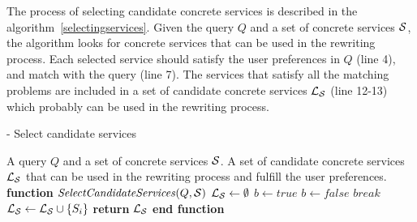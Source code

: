 The process of selecting candidate concrete services
is described in the algorithm~\ref{selectingservices}.
Given the query $Q$ and a set of concrete services $\hbox{${\cal S}$}$, the algorithm
looks for concrete services that can be used in the rewriting process.
Each selected service should satisfy the user preferences in $Q$ (line 4), and match with the query (line 7).
The services that satisfy all the matching problems are included in a set of candidate concrete services $\hbox{${\cal L_{S}}$}$ (line 12-13) which probably can be used in the rewriting process.


\begin{algorithm}
\caption{ - Select candidate services}
\label{selectingservices}
\begin{algorithmic}[1]
\REQUIRE A query $Q$ and a set of concrete services $\hbox{${\cal S}$}$.
\ENSURE A set of candidate concrete services $\hbox{${\cal L_{S}}$}$ that can be used in the rewriting process and fulfill the user preferences.
\STATE \textbf{function} $\mathit{SelectCandidateServices} (Q, \hbox{${\cal S}$})$
\STATE $\hbox{${\cal L_{S}}$} \leftarrow \emptyset$
		\STATE $b \leftarrow \mathit{true}$		
				\STATE $b \leftarrow \mathit{false}$	
				\STATE $\mathit{break}$
			\ENDIF
		\ENDFOR
			\STATE $\hbox{${\cal L_{S}}$} \leftarrow \hbox{${\cal L_{S}}$} \cup \lbrace S_{i} \rbrace$	
		\ENDIF
	\ENDIF
\ENDFOR
\STATE \textbf{return} $\hbox{${\cal L_{S}}$}$
\STATE \textbf{end function}
\end{algorithmic}
\end{algorithm}

